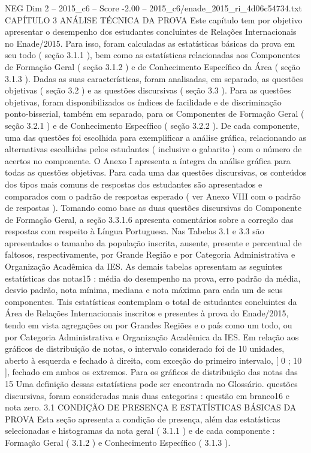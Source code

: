 \begin{textsample}{NEG Dim 2 – 2015\_c6 – Score -2.00 – 2015\_c6/enade\_2015\_ri\_4d06c54734.txt}  \label{ex:f2_neg_195}
CAPÍTULO 3 ANÁLISE TÉCNICA DA PROVA Este capítulo tem por objetivo apresentar o desempenho dos estudantes concluintes de Relações Internacionais no Enade/2015.
Para isso, foram calculadas as estatísticas básicas da prova em seu todo ( seção 3.1.1 ), bem como as estatísticas relacionadas aos Componentes de Formação Geral ( seção 3.1.2 ) e de Conhecimento Específico da Área ( seção 3.1.3 ).
Dadas as suas características, foram analisadas, em separado, as questões objetivas ( seção 3.2 ) e as questões discursivas ( seção 3.3 ).
Para as questões objetivas, foram disponibilizados os índices de facilidade e de discriminação ponto-bisserial, também em separado, para os Componentes de Formação Geral ( seção 3.2.1 ) e de Conhecimento Específico ( seção 3.2.2 ).
De cada componente, uma das questões foi escolhida para exemplificar a análise gráfica, relacionando as alternativas escolhidas pelos estudantes ( inclusive o gabarito ) com o número de acertos no componente.
O Anexo I apresenta a íntegra da análise gráfica para todas as questões objetivas.
Para cada uma das questões discursivas, os conteúdos dos tipos mais comuns de respostas dos estudantes são apresentados e comparados com o padrão de respostas esperado ( ver Anexo VIII com o padrão de respostas ).
Tomando como base as duas questões discursivas do Componente de Formação Geral, a seção 3.3.1.6 apresenta comentários sobre a correção das respostas com respeito à Língua Portuguesa.
Nas Tabelas 3.1 e 3.3 são apresentados o tamanho da população inscrita, ausente, presente e percentual de faltosos, respectivamente, por Grande Região e por Categoria Administrativa e Organização Acadêmica da IES.
As demais tabelas apresentam as seguintes estatísticas das notas15 : média do desempenho na prova, erro padrão da média, desvio padrão, nota mínima, mediana e nota máxima para cada um de seus componentes.
Tais estatísticas contemplam o total de estudantes concluintes da Área de Relações Internacionais inscritos e presentes à prova do Enade/2015, tendo em vista agregações ou por Grandes Regiões e o país como um todo, ou por Categoria Administrativa e Organização Acadêmica da IES.
Em relação aos gráficos de distribuição de notas, o intervalo considerado foi de 10 unidades, aberto à esquerda e fechado à direita, com exceção do primeiro intervalo, [ 0 ; 10 ], fechado em ambos os extremos.
Para os gráficos de distribuição das notas das 15 Uma definição dessas estatísticas pode ser encontrada no Glossário. questões discursivas, foram consideradas mais duas categorias : questão em branco16 e nota zero. 3.1 CONDIÇÃO DE PRESENÇA E ESTATÍSTICAS BÁSICAS DA PROVA Esta seção apresenta a condição de presença, além das estatísticas selecionadas e histogramas da nota geral ( 3.1.1 ) e de cada componente : Formação Geral ( 3.1.2 ) e Conhecimento Específico ( 3.1.3 ).

\end{textsample}
